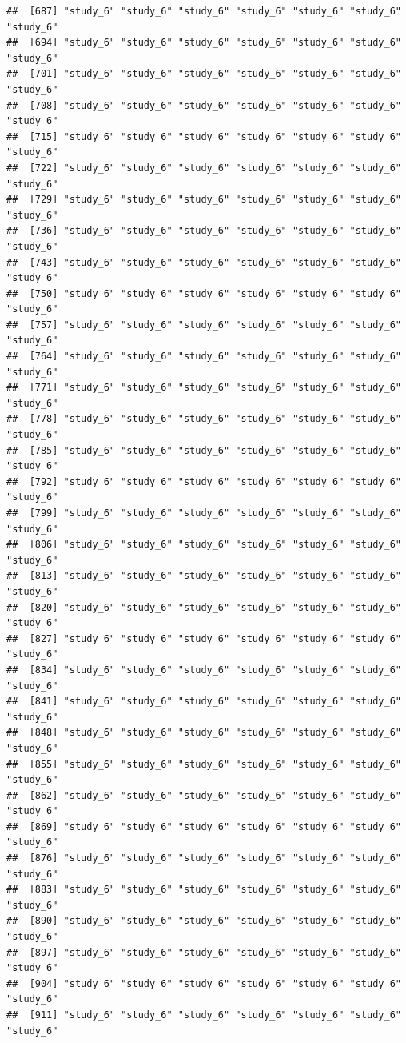 \documentclass[
  american,
  man,floatsintext]{apa7}
\begin{document}
\begin{verbatim}
##  [687] "study_6" "study_6" "study_6" "study_6" "study_6" "study_6" "study_6"
##  [694] "study_6" "study_6" "study_6" "study_6" "study_6" "study_6" "study_6"
##  [701] "study_6" "study_6" "study_6" "study_6" "study_6" "study_6" "study_6"
##  [708] "study_6" "study_6" "study_6" "study_6" "study_6" "study_6" "study_6"
##  [715] "study_6" "study_6" "study_6" "study_6" "study_6" "study_6" "study_6"
##  [722] "study_6" "study_6" "study_6" "study_6" "study_6" "study_6" "study_6"
##  [729] "study_6" "study_6" "study_6" "study_6" "study_6" "study_6" "study_6"
##  [736] "study_6" "study_6" "study_6" "study_6" "study_6" "study_6" "study_6"
##  [743] "study_6" "study_6" "study_6" "study_6" "study_6" "study_6" "study_6"
##  [750] "study_6" "study_6" "study_6" "study_6" "study_6" "study_6" "study_6"
##  [757] "study_6" "study_6" "study_6" "study_6" "study_6" "study_6" "study_6"
##  [764] "study_6" "study_6" "study_6" "study_6" "study_6" "study_6" "study_6"
##  [771] "study_6" "study_6" "study_6" "study_6" "study_6" "study_6" "study_6"
##  [778] "study_6" "study_6" "study_6" "study_6" "study_6" "study_6" "study_6"
##  [785] "study_6" "study_6" "study_6" "study_6" "study_6" "study_6" "study_6"
##  [792] "study_6" "study_6" "study_6" "study_6" "study_6" "study_6" "study_6"
##  [799] "study_6" "study_6" "study_6" "study_6" "study_6" "study_6" "study_6"
##  [806] "study_6" "study_6" "study_6" "study_6" "study_6" "study_6" "study_6"
##  [813] "study_6" "study_6" "study_6" "study_6" "study_6" "study_6" "study_6"
##  [820] "study_6" "study_6" "study_6" "study_6" "study_6" "study_6" "study_6"
##  [827] "study_6" "study_6" "study_6" "study_6" "study_6" "study_6" "study_6"
##  [834] "study_6" "study_6" "study_6" "study_6" "study_6" "study_6" "study_6"
##  [841] "study_6" "study_6" "study_6" "study_6" "study_6" "study_6" "study_6"
##  [848] "study_6" "study_6" "study_6" "study_6" "study_6" "study_6" "study_6"
##  [855] "study_6" "study_6" "study_6" "study_6" "study_6" "study_6" "study_6"
##  [862] "study_6" "study_6" "study_6" "study_6" "study_6" "study_6" "study_6"
##  [869] "study_6" "study_6" "study_6" "study_6" "study_6" "study_6" "study_6"
##  [876] "study_6" "study_6" "study_6" "study_6" "study_6" "study_6" "study_6"
##  [883] "study_6" "study_6" "study_6" "study_6" "study_6" "study_6" "study_6"
##  [890] "study_6" "study_6" "study_6" "study_6" "study_6" "study_6" "study_6"
##  [897] "study_6" "study_6" "study_6" "study_6" "study_6" "study_6" "study_6"
##  [904] "study_6" "study_6" "study_6" "study_6" "study_6" "study_6" "study_6"
##  [911] "study_6" "study_6" "study_6" "study_6" "study_6" "study_6" "study_6"

\end{verbatim}
\end{document}
